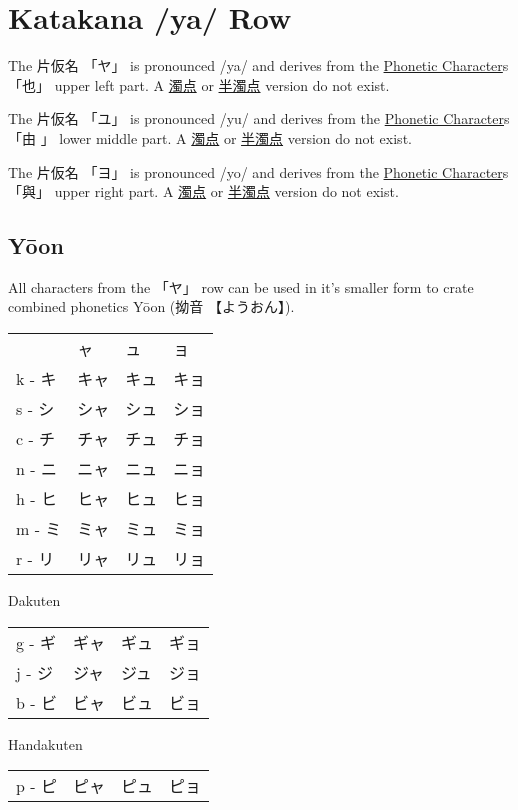 \section{Katakana /ya/ Row}\label{sec:KatakanaYaRow}


 The  片仮名 {「ヤ」} is pronounced  /ya/ and  derives from the
\hyperref[sec:PhoneticCharacter]{Phonetic Character}s {「也」} upper left part.
A \hyperref[sec:Dakuten]{濁点} or \hyperref[sec:Handakuten]{半濁点} version do
not exist.

 The  片仮名 {「ユ」} is pronounced  /yu/ and  derives from the
\hyperref[sec:PhoneticCharacter]{Phonetic Character}s {「由 」} lower middle
part.  A \hyperref[sec:Dakuten]{濁点} or \hyperref[sec:Handakuten]{半濁点}
version do not exist.

 The  片仮名 {「ヨ」} is pronounced  /yo/ and  derives from the
\hyperref[sec:PhoneticCharacter]{Phonetic Character}s {「與」} upper right
part.  A \hyperref[sec:Dakuten]{濁点} or \hyperref[sec:Handakuten]{半濁点}
version do not exist.

\newpage
\subsection{Yōon}

All characters from the {「ヤ」} row can be used in it's smaller form to crate
combined phonetics Yōon ({拗音} {【ようおん】}). 

\begin{center} \Large
\begin{tabular}{llll}
      &ャ  &ュ  &ョ  \\
k - キ&キャ&キュ&キョ\\
s - シ&シャ&シュ&ショ\\
c - チ&チャ&チュ&チョ\\
n - ニ&ニャ&ニュ&ニョ\\
h - ヒ&ヒャ&ヒュ&ヒョ\\
m - ミ&ミャ&ミュ&ミョ\\
r - リ&リャ&リュ&リョ\\
\end{tabular}

Dakuten

\begin{tabular}{llll}
g - ギ&ギャ&ギュ&ギョ\\
j - ジ&ジャ&ジュ&ジョ\\
b - ビ&ビャ&ビュ&ビョ\\
\end{tabular}

Handakuten

\begin{tabular}{llll}
p - ピ&ピャ&ピュ&ピョ\\
\end{tabular}
\end{center}


